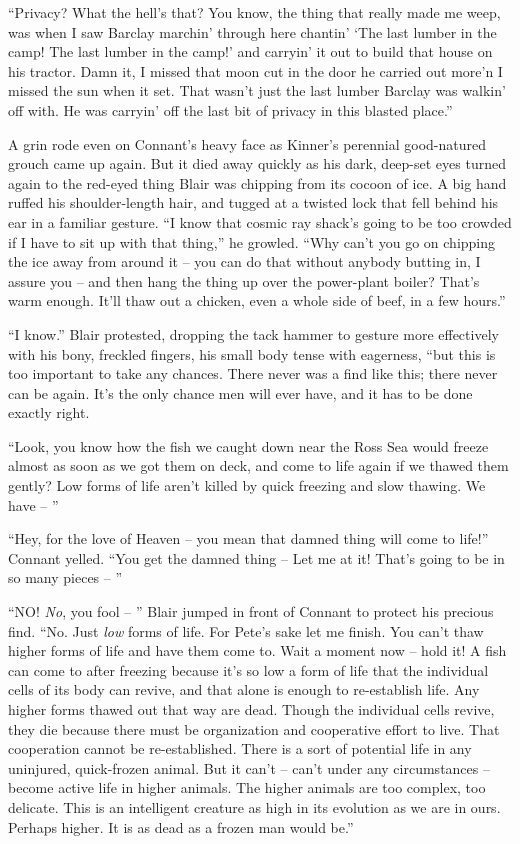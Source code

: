 \documentclass[letterpaper,openany,12pt]{memoir}		%
\begin{document}
``Privacy? What the hell's that? You know, the thing that really made me weep,
was when I saw Barclay marchin' through here chantin' `The last lumber in the
camp! The last lumber in the camp!' and carryin' it out to build that house on
his tractor. Damn it, I missed that moon cut in the door he carried out more'n I
missed the sun when it set. That wasn't just the last lumber Barclay was walkin'
off with. He was carryin' off the last bit of privacy in this blasted place.''

A grin rode even on Connant's heavy face as Kinner's perennial good-natured
grouch came up again. But it died away quickly as his dark, deep-set eyes turned
again to the red-eyed thing Blair was chipping from its cocoon of ice. A big
hand ruffed his shoulder-length hair, and tugged at a twisted lock that fell
behind his ear in a familiar gesture. ``I know that cosmic ray shack's going to
be too crowded if I have to sit up with that thing,'' he growled. ``Why can't
you go on chipping the ice away from around it -- you can do that without
anybody butting in, I assure you -- and then hang the thing up over the
power-plant boiler? That's warm enough. It'll thaw out a chicken, even a whole
side of beef, in a few hours.''

``I know.'' Blair protested, dropping the tack hammer to gesture more
effectively with his bony, freckled fingers, his small body tense with
eagerness, ``but this is too important to take any chances. There never was a
find like this; there never can be again. It's the only chance men will ever
have, and it has to be done exactly right.

``Look, you know how the fish we caught down near the Ross Sea would freeze
almost as soon as we got them on deck, and come to life again if we thawed them
gently? Low forms of life aren't killed by quick freezing and slow thawing. We
have -- ''

``Hey, for the love of Heaven -- you mean that damned thing will come to life!''
Connant yelled. ``You get the damned thing -- Let me at it! That's going to be
in so many pieces -- ''

``NO! \emph{No}, you fool -- '' Blair jumped in front of Connant to protect his
precious find. ``No. Just \emph{low} forms of life. For Pete's sake let me
finish. You can't thaw higher forms of life and have them come to. Wait a moment
now -- hold it! A fish can come to after freezing because it's so low a form of
life that the individual cells of its body can revive, and that alone is enough
to re-establish life. Any higher forms thawed out that way are dead. Though the
individual cells revive, they die because there must be organization and
cooperative effort to live. That cooperation cannot be re-established. There is
a sort of potential life in any uninjured, quick-frozen animal. But it can't --
can't under any circumstances -- become active life in higher animals. The
higher animals are too complex, too delicate. This is an intelligent creature as
high in its evolution as we are in ours. Perhaps higher. It is as dead as a
frozen man would be.''
\end{document}
